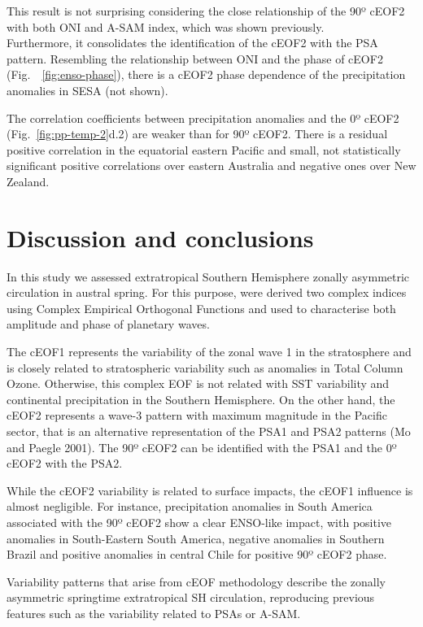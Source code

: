 \documentclass[pdflatex,sn-basic]{sn-jnl}
\theoremstyle{thmstyleone}%
\theoremstyle{thmstyletwo}%
\theoremstyle{thmstylethree}%
\begin{document}
This result is not surprising considering the close relationship of the 90º cEOF2 with both ONI and A-SAM index, which was shown previously.\\
Furthermore, it consolidates the identification of the cEOF2 with the PSA pattern. Resembling the relationship between ONI and the phase of cEOF2 (Fig.~~\ref{fig:enso-phase}), there is a cEOF2 phase dependence of the precipitation anomalies in SESA (not shown).

The correlation coefficients between precipitation anomalies and the 0º cEOF2 (Fig.~\ref{fig:pp-temp-2}d.2) are weaker than for 90º cEOF2.
There is a residual positive correlation in the equatorial eastern Pacific and small, not statistically significant positive correlations over eastern Australia and negative ones over New Zealand.

\hypertarget{discussion}{%
\section{Discussion and conclusions}\label{discussion}}

In this study we assessed extratropical Southern Hemisphere zonally asymmetric circulation in austral spring.
For this purpose, were derived two complex indices using Complex Empirical Orthogonal Functions and used to characterise both amplitude and phase of planetary waves.

The cEOF1 represents the variability of the zonal wave 1 in the stratosphere and is closely related to stratospheric variability such as anomalies in Total Column Ozone.
Otherwise, this complex EOF is not related with SST variability and continental precipitation in the Southern Hemisphere.
On the other hand, the cEOF2 represents a wave-3 pattern with maximum magnitude in the Pacific sector, that is an alternative representation of the PSA1 and PSA2 patterns (Mo and Paegle 2001).
The 90º cEOF2 can be identified with the PSA1 and the 0º cEOF2 with the PSA2.

While the cEOF2 variability is related to surface impacts, the cEOF1 influence is almost negligible.
For instance, precipitation anomalies in South America associated with the 90º cEOF2 show a clear ENSO-like impact, with positive anomalies in South-Eastern South America, negative anomalies in Southern Brazil and positive anomalies in central Chile for positive 90º cEOF2 phase.

Variability patterns that arise from cEOF methodology describe the zonally asymmetric springtime extratropical SH circulation, reproducing previous features such as the variability related to PSAs or A-SAM.
\end{document}
